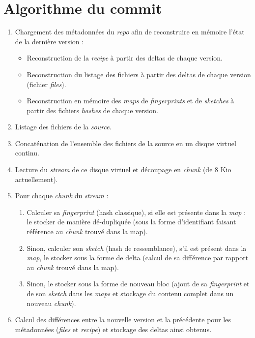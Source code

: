 \documentclass[a4paper]{report}
\begin{document}

\section{Algorithme du commit}

\begin{enumerate}
\item
  Chargement des métadonnées du \emph{repo} afin de reconstruire en
  mémoire l'état de la dernière version :

  \begin{itemize}
  \item
    Reconstruction de la \emph{recipe} à partir des deltas de chaque
    version.
  \item
    Reconstruction du listage des fichiers à partir des deltas de chaque
    version (fichier \emph{files}).
  \item
    Reconstruction en mémoire des \emph{maps} de \emph{fingerprints} et
    de \emph{sketches} à partir des fichiers \emph{hashes} de chaque
    version.
  \end{itemize}
\item
  Listage des fichiers de la \emph{source}.
\item
  Concaténation de l'ensemble des fichiers de la source en un disque
  virtuel continu.
\item
  Lecture du \emph{stream} de ce disque virtuel et découpage en
  \emph{chunk} (de 8 Kio actuellement).
\item
  Pour chaque \emph{chunk} du \emph{stream} :

  \begin{enumerate}
  \item
    Calculer sa \emph{fingerprint} (hash classique), si elle est
    présente dans la \emph{map} : le stocker de manière dé-dupliquée
    (sous la forme d'identifiant faisant référence au \emph{chunk}
    trouvé dans la map).
  \item
    Sinon, calculer son \emph{sketch} (hash de ressemblance), s'il est
    présent dans la \emph{map}, le stocker sous la forme de delta
    (calcul de sa différence par rapport au \emph{chunk} trouvé dans la
    map).
  \item
    Sinon, le stocker sous la forme de nouveau bloc (ajout de sa
    \emph{fingerprint} et de son \emph{sketch} dans les \emph{maps} et
    stockage du contenu complet dans un nouveau \emph{chunk}).
  \end{enumerate}
\item
  Calcul des différences entre la nouvelle version et la précédente pour
  les métadonnées (\emph{files} et \emph{recipe}) et stockage des deltas
  ainsi obtenus.
\end{enumerate}
\end{document}
